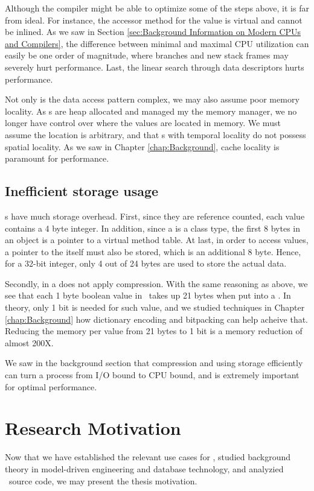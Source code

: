 Although the compiler might be able to optimize some of the steps above, it is far from ideal. For instance, the accessor method for the value is virtual and cannot be inlined. As we saw in Section \ref{sec:Background Information on Modern CPUs and Compilers}, the difference between minimal and maximal CPU utilization can easily be one order of magnitude, where branches and new stack frames may severely hurt performance. Last, the linear search through data descriptors hurts performance.

Not only is the data access pattern complex, we may also assume poor memory locality. As s are heap allocated and managed my the memory manager, we no longer have control over where the values are located in memory. We must assume the location is arbitrary, and that s with temporal locality do not possess spatial locality. As we saw in Chapter \ref{chap:Background}, cache locality is paramount for performance.

\subsection{Inefficient storage usage}
\label{sub:Inefficient storage usage}
s have much storage overhead. First, since they are reference counted, each value contains a 4 byte integer. In addition, since a  is a class type, the first 8 bytes in an object is a pointer to a virtual method table. At last, in order to access values, a pointer to the  itself must also be stored, which is an additional 8 byte. Hence, for a 32-bit integer, only 4 out of 24 bytes are used to store the actual data.

Secondly,  in a  does not apply compression. With the same reasoning as above, we see that each 1 byte boolean value in \gap~takes up 21 bytes when put into a . In theory, only 1 bit is needed for such value, and we studied techniques in Chapter \ref{chap:Background} how dictionary encoding and bitpacking can help acheive that. Reducing the memory per value from 21 bytes to 1 bit is a memory reduction of almost 200X.

We saw in the background section that compression and using storage efficiently can turn a process from I/O bound to CPU bound, and is extremely important for optimal performance.

\section{Research Motivation}
\label{sec:Research Motivation}
Now that we have established the relevant use cases for \genus, studied background theory in model-driven engineering and database technology, and analyzied \gap~source code, we may present the thesis motivation.

